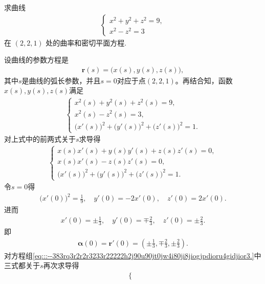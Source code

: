 \documentclass[../../main.tex]{subfiles}%
\begin{document}
\begin{example}
求曲线
\begin{align*}
\begin{cases}
x^2 + y^2 + z^2 = 9, \\
x^2 - z^2 = 3
\end{cases}
\end{align*}
在 $(2,2,1)$ 处的曲率和密切平面方程.
\end{example}
\begin{solution}

设曲线的参数方程是
\begin{align*}
\bm{r}(s) = \big(x(s), y(s), z(s)\big),
\end{align*}
其中$s$是曲线的弧长参数，并且$s=0$对应于点$(2,2,1)$。再结合知，函数$x(s), y(s), z(s)$满足
\begin{align*}
\begin{cases}
x^2(s) + y^2(s) + z^2(s) = 9, \\
x^2(s) - z^2(s) = 3, \\
\big(x'(s)\big)^2 + \big(y'(s)\big)^2 + \big(z'(s)\big)^2 = 1.
\end{cases}
\end{align*}
对上式中的前两式关于$s$求导得
\begin{align}
\begin{cases}
x(s)x'(s) + y(s)y'(s) + z(s)z'(s) = 0, \\
x(s)x'(s) - z(s)z'(s) = 0, \\
\big(x'(s)\big)^2 + \big(y'(s)\big)^2 + \big(z'(s)\big)^2 = 1.
\end{cases}
\label{eq:::--383rq3r2r2r3233r22222h2j90u90jt0jw4i80ji8jiogjpdioru4gidjior3.}
\end{align}
令$s=0$得
\begin{align*}
\big(x'(0)\big)^2 = \frac{1}{9}, \quad y'(0) = -2x'(0), \quad z'(0) = 2x'(0).
\end{align*}
进而
\begin{align*}
x'(0) = \pm \frac{1}{3}, \quad y'(0) = \mp \frac{2}{3}, \quad z'(0) = \pm \frac{2}{3}.
\end{align*}
即
\begin{align*}
\bm{\alpha}(0) = \bm{r}'(0) = \left( \pm \frac{1}{3}, \mp \frac{2}{3}, \pm \frac{2}{3} \right).
\end{align*}
对方程组\eqref{eq:::--383rq3r2r2r3233r22222h2j90u90jt0jw4i80ji8jiogjpdioru4gidjior3.}中三式都关于$s$再次求导得
\begin{align*}
\begin{cases}

\end{cases}
\end{align*}
\end{solution}
\end{document}
